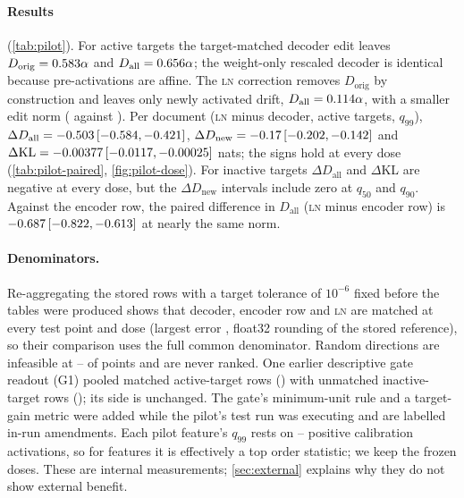 \documentclass{article}
\theoremstyle{plain}
\theoremstyle{definition}
\theoremstyle{remark}
\newcommand{\LN}{\textsc{ln}}
\begin{document}
\paragraph{Results} (\cref{tab:pilot}). For active targets the target-matched decoder
edit leaves $D_{\mathrm{orig}} = 0.583\alpha$ and $D_{\mathrm{all}} =
0.656\alpha$; the weight-only rescaled decoder is identical because pre-activations
are affine. The \LN{} correction removes $D_{\mathrm{orig}}$ by construction and leaves only
newly activated drift, $D_{\mathrm{all}} = 0.114\alpha$, with a smaller edit norm
(\PilotNormLn{} against \PilotNormDec). Per document (\LN{} minus decoder, active targets,
$q_{99}$), $\Delta D_{\mathrm{all}} = -0.503\,\allowbreak[-0.584, -0.421]$, $\Delta D_{\mathrm{new}} =
-0.17\,\allowbreak[-0.202, -0.142]$ and $\Delta\mathrm{KL} = -0.00377\,\allowbreak[-0.0117, -0.00025]$ nats; the signs hold at every dose
(\cref{tab:pilot-paired}, \cref{fig:pilot-dose}). For inactive targets $\Delta D_{\mathrm{all}}$ and $\Delta$KL are
negative at every dose, but the $\Delta D_{\mathrm{new}}$ intervals include zero at
$q_{50}$ and $q_{90}$. Against the encoder row, the paired difference in $D_{\mathrm{all}}$
(\LN{} minus encoder row) is $-0.687\,\allowbreak[-0.822, -0.613]$ at nearly the same norm.

\paragraph{Denominators.} Re-aggregating the stored rows with a target tolerance of
$10^{-6}$ fixed before the tables were produced shows that decoder, encoder row and \LN{} are
matched at every test point and dose (largest error \RgTgtErrMax, float32 rounding of the
stored reference), so their comparison uses the full common denominator. Random directions
are infeasible at \RgSecExclMin--\RgSecExclMax{} of points and are never ranked. One earlier
descriptive gate readout (G1) pooled matched active-target rows (\RgGOneAct) with unmatched
inactive-target rows (\RgGOneInact); its side is unchanged. The gate's minimum-unit rule and
a target-gain metric were added while the pilot's test run was executing and are labelled
in-run amendments. Each pilot feature's $q_{99}$ rests on \RgNPosMin--\RgNPosMax{} positive
calibration activations, so for \RgTopTwo{} features it is effectively a top order
statistic; we keep the frozen doses. These are internal measurements; \cref{sec:external}
explains why they do not show external benefit.
\end{document}

